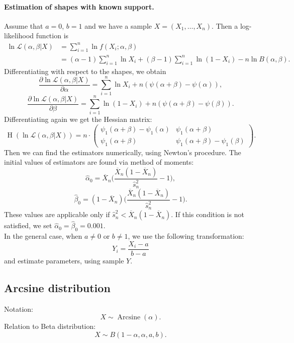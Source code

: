 \documentclass[a4paper,11pt]{article}
\theoremstyle{plain}
\theoremstyle{definition}
\begin{document}
	\paragraph{Estimation of shapes with known support.} Assume that $a=0$, $b=1$ and we have a sample $X = (X_1, \dots, X_n)$. Then a log-likelihood function is
	\begin{equation} \label{Beta log-likelihood}
	\begin{aligned}
	\ln \mathcal{L} (\alpha, \beta | X) &= \sum_{i=1}^{n} \ln f(X_i; \alpha, \beta) \\
	& = (\alpha - 1) \sum_{i=1}^{n} \ln X_i + (\beta - 1) \sum_{i=1}^{n}\ln (1-X_i) - n \ln B(\alpha, \beta).
	\end{aligned}  
	\end{equation}
	Differentiating with respect to the shapes, we obtain
	\[
	\frac{\partial \ln \mathcal{L}(\alpha, \beta | X)}{\partial \alpha} = \sum_{i=1}^{n} \ln X_i + n(\psi(\alpha + \beta) - \psi(\alpha)),
	 \]
	\[
	\frac{\partial \ln \mathcal{L}(\alpha, \beta | X)}{\partial \beta} = \sum_{i=1}^{n} \ln (1-X_i) + n(\psi(\alpha + \beta) - \psi(\beta)).
	\]
	Differentiating again we get the Hessian matrix:
	\[
	\operatorname{H}(\ln\mathcal{L}(\alpha,\beta|X)) = n \cdot \begin{pmatrix}
	\psi_1(\alpha+\beta)-\psi_1(\alpha) & \psi_1(\alpha+\beta) \\
	\psi_1(\alpha+\beta) & \psi_1(\alpha+\beta)-\psi_1(\beta)
	\end{pmatrix}.
	\]
	Then we can find the estimators numerically, using Newton's procedure. The initial values of estimators are found via method of moments:
	\[
	\hat{\alpha}_0 = \overline{X}_n \Bigg( \frac{\overline{X}_n(1-\overline{X}_n)}{\hat{s}_n^2} - 1 \Bigg),
	\]
	\[
	\hat{\beta}_0 = (1-\overline{X}_n) \Bigg( \frac{\overline{X}_n(1-\overline{X}_n)}{\hat{s}_n^2} - 1 \Bigg).
	\]
	These values are applicable only if $\hat{s}_n^2 < \overline{X}_n(1-\overline{X}_n)$. If this condition is not satisfied, we set $\hat{\alpha}_0 = \hat{\beta}_0 = 0.001$.\\
	In the general case, when $a \neq 0$ or $b \neq 1$, we use the following transformation:
	\[ Y_i = \frac{X_i - a}{b - a} \]
	and estimate parameters, using sample $Y$.
	
	\subsection{Arcsine distribution}
	Notation:
	\[
	X \sim \operatorname{Arcsine}(\alpha).
	\]
	Relation to Beta distribution: \[ X \sim B(1-\alpha, \alpha, a, b). \]
\end{document}
